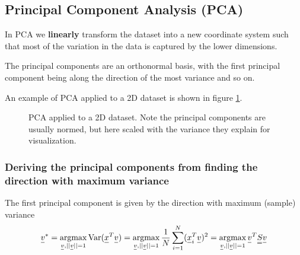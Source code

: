 \subsection{Principal Component Analysis (PCA)}
In PCA we \textbf{linearly} transform the dataset into a new coordinate system such that
most of the variation in the data is captured by the lower dimensions.

The principal components are an orthonormal basis, with the first principal component
being along the direction of the most variance and so on.

An example of PCA applied to a 2D dataset is shown in figure \ref{fig:pca}.

\begin{figure}[!htb]
    \centering
    
    \caption{PCA applied to a 2D dataset. Note the principal components are usually normed, but
    here scaled with the variance they explain for visualization.}
    \label{fig:pca}
\end{figure}

\subsubsection{Deriving the principal components from finding the direction with maximum variance}

The first principal component is given by the direction with maximum (sample) variance
\begin{equation}
    \vec{v}^* = \argmax_{\vec{v}, ||\vec{v}|| = 1} \Var(\vec{x}^T\vec{v}) = \argmax_{\vec{v}, ||\vec{v}|| = 1} \frac{1}{N} \sum_{i=1}^{N} (\vec{x}_i^T \vec{v})^2 = \argmax_{\vec{v}, ||\vec{v}|| = 1} \vec{v}^T \mat{S} \vec{v}
\end{equation}

